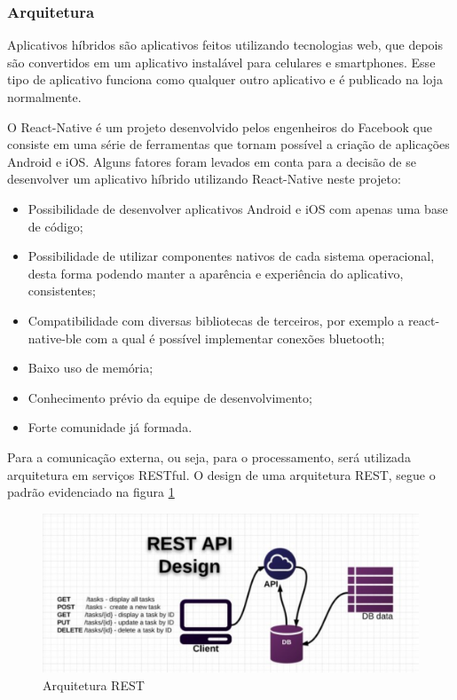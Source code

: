 	\subsubsection{Arquitetura}
	Aplicativos híbridos são aplicativos feitos utilizando tecnologias web, que depois são convertidos em um aplicativo instalável para celulares e smartphones. Esse tipo de aplicativo funciona como qualquer outro aplicativo e é publicado na loja normalmente.

O React-Native é um projeto desenvolvido pelos engenheiros do Facebook  que consiste em uma série de ferramentas que tornam possível a criação de aplicações Android e iOS. Alguns fatores foram levados em conta para a decisão de se desenvolver um aplicativo híbrido utilizando React-Native neste projeto:

\begin{itemize}
\item Possibilidade de desenvolver aplicativos Android e iOS com apenas uma base de código;
\item Possibilidade de utilizar componentes nativos de cada sistema operacional, desta forma podendo manter a aparência e experiência do aplicativo, consistentes;
\item Compatibilidade com diversas bibliotecas de terceiros,  por exemplo a react-native-ble  com a qual é possível implementar conexões bluetooth;
\item Baixo uso de memória;
\item Conhecimento prévio da equipe de desenvolvimento;
\item Forte comunidade já formada.

\end{itemize}

	Para a comunicação externa, ou seja, para o processamento, será utilizada arquitetura em serviços RESTful.
O design de uma arquitetura REST, segue o padrão evidenciado na figura \ref{img:arquitetura}

\graphicspath{{figuras/}}
\begin{figure}[h!]
\centering
\includegraphics[scale=0.80]{arquitetura}
\caption{Arquitetura REST}
\label{img:arquitetura}
\end{figure}


